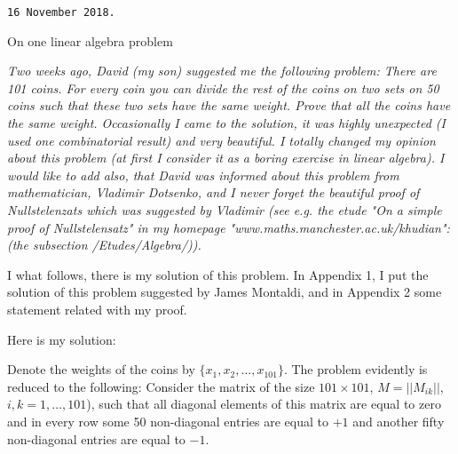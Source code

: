 

 \baselineskip=14pt
\def\vare {\varepsilon}
\def\A {{\bf A}}
\def\t {\tilde}
\def\a {\alpha}
\def\K {{\bf K}}
\def\N {{\bf N}}
\def\V {{\cal V}}
\def\s {{\sigma}}
\def\S {{\Sigma}}
\def\s {{\sigma}}
\def\p{\partial}
\def\vare{{\varepsilon}}
\def\Q {{\bf Q}}
\def\D {{\cal D}}
\def\G {{\Gamma}}
\def\C {{\bf C}}
\def\M {{\cal M}}
\def\Z {{\bf Z}}
\def\U  {{\cal U}}
\def\H {{\cal H}}
\def\R  {{\bf R}}
\def\E  {{\bf E}}
\def\l {\lambda}
\def\degree {{\bf {\rm degree}\,\,}}
\def \finish {${\,\,\vrule height1mm depth2mm width 8pt}$}
\def \m {\medskip}
\def\p {\partial}
\def\r {{\bf r}}
\def\v {{\bf v}}
\def\n {{\bf n}}
\def\t {{\bf t}}
\def\b {{\bf b}}
\def\e{{\bf e}}
\def\ac {{\bf a}}
\def \X   {{\bf X}}
\def \Y   {{\bf Y}}
\def \x   {{\bf x}}
\def \y   {{\bf y}}




{\tt 16 November 2018.}


\centerline {On one linear algebra problem}

 {\it Two weeks ago, David (my son) suggested me the following problem:
  There are 101 coins. For every coin you can divide the
rest of the coins on two sets on  50 coins such that these two sets have
the same weight. Prove that all the coins have the same
weight.  Occasionally I came to the solution, it was highly unexpected
(I used one combinatorial result)
and  very beautiful. I totally changed
my opinion about this problem  (at first I consider it as a boring
exercise in linear algebra).
I would like to add also, that
   David was informed about this problem  from mathematician,
Vladimir Dotsenko, and I never forget the  beautiful proof of
Nullstelenzats which was suggested by Vladimir (see e.g. the etude
"On a simple proof of Nullstelensatz" in my homepage
 "www.maths.manchester.ac.uk/khudian": (the subsection
   /Etudes/Algebra/)).

I what follows, there is my solution of this problem.
In Appendix 1, I put the solution of this problem suggested by 
James Montaldi, and in Appendix 2 some statement related with my proof.
}


\medskip

Here is my solution:

\smallskip

    Denote the weights of the coins
    by $\{x_1,x_2,\dots,x_{101}\}$.  The problem evidently is reduced
to the following: Consider the matrix of the size $101\times 101$,
$M=||M_{ik}||$, $i,k=1,\dots,101$),
such that all diagonal elements of this matrix are equal to
zero and in every row some  50 non-diagonal entries are equal to $+1$
and another fifty non-diagonal entries are equal to $-1$.

